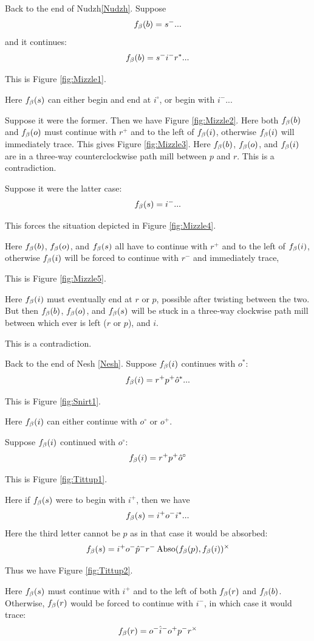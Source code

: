 Back to the end of Nudzh\ref{Nudzh}. Suppose
$$f_\beta(b) = s^-...$$
and it continues:
$$f_\beta(b) = s^- i^- r^*...$$

This is Figure \ref{fig:Mizzle1}.

Here $f_\beta(s)$ can either begin and end at $i^\circ$, or begin with $i^-...$

Suppose it were the former. Then we have Figure \ref{fig:Mizzle2}. Here both $f_\beta(b)$ and $f_\beta(o)$ must continue with $r^+$ and to the left of $f_\beta(i)$, otherwise $f_\beta(i)$ will immediately trace. This gives Figure \ref{fig:Mizzle3}. Here $f_\beta(b)$, $f_\beta(o)$, and $f_\beta(i)$ are in a three-way counterclockwise path mill between $p$ and $r$. This is a contradiction.

Suppose it were the latter case:
$$f_\beta(s) = i^-...$$

This forces the situation depicted in Figure \ref{fig:Mizzle4}. 

Here $f_\beta(b)$, $f_\beta(o)$, and $f_\beta(s)$ all have to continue with $r^+$ and to the left of $f_\beta(i)$, otherwise $f_\beta(i)$ will be forced to continue with $r^-$ and immediately trace,

This is Figure \ref{fig:Mizzle5}.

Here $f_\beta(i)$ must eventually end at $r$ or $p$, possible after twisting between the two. But then $f_\beta(b)$, $f_\beta(o)$, and $f_\beta(s)$ will be stuck in a three-way clockwise path mill between which ever is left ($r$ or $p$), and $i$. 

This is a contradiction.

\label{Snirt}
Back to the end of Nesh \ref{Nesh}. Suppose $f_\beta(i)$ continues with $o^*$:
$$f_\beta(i) = r^+ p^+ \hat{o}^*...$$

This is Figure \ref{fig:Snirt1}.

Here $f_\beta(i)$ can either continue with $o^\circ$ or $o^+$.

\label{Tittup}
Suppose $f_\beta(i)$ continued with $o^\circ$:
$$f_\beta(i) = r^+ p^+ \hat{o}^\circ$$

This is Figure \ref{fig:Tittup1}.

Here if $f_\beta(s)$ were to begin with $i^+$, then we have
$$f_\beta(s) = i^+ o^- i^*...$$
Here the third letter cannot be $p$ as in that case it would be absorbed:
$$f_\beta(s) = i^+ o^- \hat{p}^- r^- \operatorname{Abso}(f_\beta(p), f_\beta(i))^\times$$

Thus we have Figure \ref{fig:Tittup2}.

Here $f_\beta(s)$ must continue with $i^+$ and to the left of both $f_\beta(r)$ and $f_\beta(b)$. Otherwise, $f_\beta(r)$ would be forced to continue with $i^-$, in which case it would trace:
$$f_\beta(r) = o^- \hat{i}^- o^+ p^- r^\times$$

